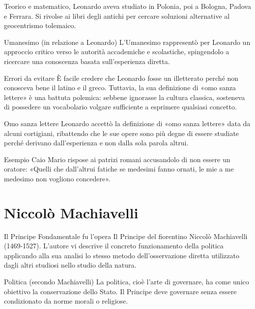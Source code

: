 \documentclass[12pt]{article}
\begin{document}
Teorico e matematico, Leonardo aveva studiato in Polonia, poi a Bologna, Padova e Ferrara. Si rivolse ai libri degli antichi per cercare soluzioni alternative al geocentrismo tolemaico.


\begin{defn}{Umanesimo (in relazione a Leonardo)}
L'Umanesimo rappresentò per Leonardo un approccio critico verso le autorità accademiche e scolastiche, spingendolo a ricercare una conoscenza basata sull'esperienza diretta.
\end{defn}


\begin{trap}{Errori da evitare}
È facile credere che Leonardo fosse un illetterato perché non conosceva bene il latino e il greco. Tuttavia, la sua definizione di «omo sanza lettere» è una battuta polemica: sebbene ignorasse la cultura classica, sosteneva di possedere un vocabolario volgare sufficiente a esprimere qualsiasi concetto.
\end{trap}


\begin{defn}{Omo sanza lettere}
Leonardo accettò la definizione di «omo sanza lettere» data da alcuni cortigiani, ribattendo che le sue opere sono più degne di essere studiate perché derivano dall'esperienza e non dalla sola parola altrui.
\end{defn}


\begin{ex}{Esempio}
Caio Mario rispose ai patrizi romani accusandolo di non essere un oratore: «Quelli che dall'altrui fatiche se medesimi fanno ornati, le mie a me medesimo non vogliono concedere».
\end{ex}


\section{Niccolò Machiavelli}


\begin{defn}{Il Principe}
Fondamentale fu l'opera Il Principe del fiorentino Niccolò Machiavelli (1469-1527). L'autore vi descrive il concreto funzionamento della politica applicando alla sua analisi lo stesso metodo dell'osservazione diretta utilizzato dagli altri studiosi nello studio della natura.
\end{defn}


\begin{defn}{Politica (secondo Machiavelli)}
La politica, cioè l'arte di governare, ha come unico obiettivo la conservazione dello Stato. Il Principe deve governare senza essere condizionato da norme morali o religiose.
\end{defn}
\end{document}
